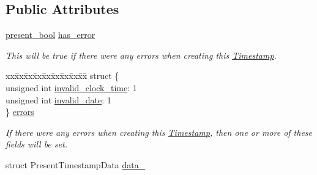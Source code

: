\subsection*{Public Attributes}
\begin{DoxyCompactItemize}
\item 
\hyperlink{types_8h_a1c24e2cdd988b886e889080ded176ae0}{present\-\_\-bool} \hyperlink{structTimestamp_a7e49819ae41a46b5cae479d9ddbc3bdf}{has\-\_\-error}
\begin{DoxyCompactList}\small\item\em This will be true if there were any errors when creating this \hyperlink{structTimestamp}{Timestamp}. \end{DoxyCompactList}\item 
\begin{tabbing}
xx\=xx\=xx\=xx\=xx\=xx\=xx\=xx\=xx\=\kill
struct \{\\
\>unsigned int \hyperlink{structTimestamp_ad56711d7488c95189fd4635590b8adef}{invalid\_clock\_time}: 1\\
\>unsigned int \hyperlink{structTimestamp_ae74e1930abf6be5d7dfe552710c87899}{invalid\_date}: 1\\
\} \hyperlink{structTimestamp_abafff530b3a467c1dcc27b780f89d0a0}{errors}\\

\end{tabbing}\begin{DoxyCompactList}\small\item\em If there were any errors when creating this \hyperlink{structTimestamp}{Timestamp}, then one or more of these fields will be set. \end{DoxyCompactList}\item 
struct Present\-Timestamp\-Data \hyperlink{structTimestamp_adf3177050edc50aa8b6e768922e4cf56}{data\-\_\-}
\end{DoxyCompactItemize}

